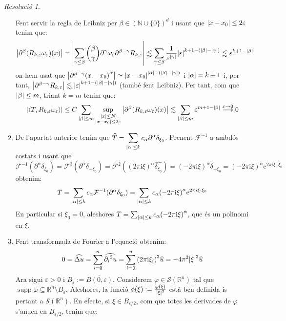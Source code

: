 \documentclass[10pt,a4paper]{article}
\newcommand{\NN}{\ensuremath{\mathbb{N}}} %
\newcommand{\RR}{\ensuremath{\mathbb{R}}} %
\newcommand{\ii}{\mathrm{i}} %
\DeclareMathOperator{\supp}{\mathrm{supp}} %
\theoremstyle{definition}
\theoremstyle{remark}
\newtheorem*{res}{Resolució}
\newcommand{\F}{\mathcal{F}} %
\renewcommand{\exp}[1]{\mathrm{e}^{#1}} %
\begin{document}
\begin{res}
\begin{enumerate}
          Fent servir la regla de Leibniz per $\beta\in (\NN\cup\{0\})^d$ i usant que $\abs{x-x_0}\leq 2 \varepsilon$ tenim que:
          $$
            \abs{\partial^\beta (R_{k,\varepsilon}\omega_\varepsilon)(x)} = \abs{\sum_{\gamma\leq \beta}\binom{\beta}{\gamma}\partial^\gamma \omega_\varepsilon\partial^{\beta-\gamma} R_{k,\varepsilon}}\lesssim\sum_{\gamma\leq \beta} \frac{1}{\varepsilon^{\abs{\gamma}}}\abs{\varepsilon}^{k+1 - (\abs{\beta}-\abs{\gamma})}\lesssim \varepsilon^{k+1-\abs{\beta}}
          $$
          on hem usat que $\abs{\partial^{\beta-\gamma} {(x-x_0)}^\alpha}\simeq \abs{x-x_0}^{\abs{\alpha} - (\abs{\beta}-\abs{\gamma})}$ i $\abs{\alpha} = k+1$ i, per tant, $\abs{\partial^{\beta-\gamma}R_{k,\varepsilon}}\lesssim \abs{\varepsilon}^{k+1 - (\abs{\beta}-\abs{\gamma})}$ (també fent Leibniz). Per tant, com que $\abs{\beta} \leq m$, triant $k=m$ tenim que:
          $$
            \abs{\langle T,R_{k,\varepsilon}\omega_\varepsilon\rangle}\leq C\sum_{\abs{\beta}\leq m}\sup_{\substack{\abs{x}\leq N\\ \abs{x-x_0}\leq 2\varepsilon}}\abs{\partial^\beta (R_{k,\varepsilon}\omega_\varepsilon)(x)}\lesssim\sum_{\abs{\beta}\leq m}\varepsilon^{m+1-\abs{\beta}}\overset{\varepsilon\to 0}{\longrightarrow}0
          $$
    \item De l'apartat anterior tenim que $\displaystyle\widehat{T} = \sum_{\abs{\alpha}\leq k}c_\alpha\partial^\alpha\delta_{\xi_0}$. Prenent $\F^{-1}$ a ambdós costats i usant que
          $$
            \F^{-1}({\partial^\alpha\delta_{\xi_0}})= \F^3({\partial^\alpha\delta_{-\xi_0}}) = \F^2({(2\pi\ii\xi)}^\alpha\widehat{\delta_{\xi_0}})= {(-2\pi\ii\xi)}^\alpha\widehat{\delta_{-\xi_0}}={(-2\pi\ii\xi)}^\alpha \exp{2\pi i \xi\cdot\xi_0}
          $$
          obtenim:
          $$
            T = \sum_{\abs{\alpha}\leq k}c_\alpha\F^{-1}({\partial^\alpha\delta_{\xi_0}}) =\sum_{\abs{\alpha}\leq k}c_\alpha{(-2\pi\ii\xi)}^\alpha\exp{2\pi i \xi\cdot\xi_0}
          $$
          En particular si $\xi_0=0$, aleshores ${T} = \sum_{\abs{\alpha}\leq k}c_\alpha{(-2\pi\ii\xi)}^\alpha$, que és un polinomi en $\xi$.
    \item Fent transformada de Fourier a l'equació obtenim:
          $$
            0=\widehat{\Delta u} =\sum_{i=0}^n \widehat{{\partial_i}^2 u} = \sum_{i=0}^n {(2\pi\ii\xi_i)}^2\widehat{u} = -4\pi^2\abs{\xi}^2\widehat{u}
          $$
          Ara sigui $\varepsilon>0$ i $B_\varepsilon:=\overline{B(0,\varepsilon)}$. Considerem $\varphi\in\mathcal{S}(\RR^n)$ tal que $\supp\varphi\subseteq \RR^n\setminus B_\varepsilon$. Aleshores, la funció $\phi(\xi):=\frac{\varphi(\xi)}{\abs{\xi}^2}$ està ben definida is pertant a $\mathcal{S}(\RR^n)$. En efecte, si $\xi\in B_{\varepsilon/2}$, com que totes les derivades de $\varphi$ s'anu\lgem en en $B_{\varepsilon/2}$, tenim que:

\end{enumerate}
\end{res}
\end{document}
